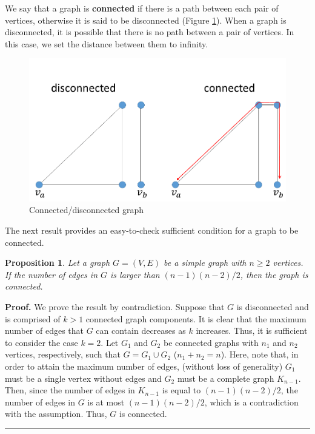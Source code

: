 \documentclass[10.5pt, A4paper, openany, uplatex]{book}
\newtheorem{proposition}[theorem]{Proposition}
{\theorembodyfont{\upshape}
\newtheorem{remark}{Remark}
}
\newenvironment{proof}[1][Proof]{\textbf{#1.} }{\  \rule{0.5em}{0.5em}}
\numberwithin{equation}{section}
\begin{document}
\begin{appendices}
	We say that a graph is \textbf{connected} if there is a path between each pair of vertices, otherwise it is said to be disconnected (Figure \ref{fig:connected}).
	When a graph is disconnected, it is possible that there is no path between a pair of vertices.
	In this case, we set the distance between them to infinity.
	
	\begin{figure}[h!]
		\begin{center}
			\includegraphics[width = 12cm]{connected.png}
			\caption{Connected/disconnected graph\label{fig:connected}}
		\end{center}
	\end{figure}
	
	The next result provides an easy-to-check sufficient condition for a graph to be connected.
	\begin{proposition}
		Let a graph $G = (V, E)$ be a simple graph with $n \ge 2$ vertices. 
		If the number of edges in $G$ is larger than $(n-1)(n-2)/2$, then the graph is connected.
	\end{proposition}
	
	\begin{proof}
		We prove the result by contradiction.
		Suppose that $G$ is disconnected and is comprised of $k > 1$ connected graph components.
		It is clear that the maximum number of edges that $G$ can contain decreases as $k$ increases.
		Thus, it is sufficient to consider the case $k = 2$.
		Let $G_1$ and $G_2$ be connected graphs with $n_1$ and $n_2$ vertices, respectively, such that $G = G_1 \cup G_2$ ($n_1 + n_2 = n$).
		Here, note that, in order to attain the maximum number of edges, (without loss of generality) $G_1$ must be a single vertex without edges and $G_2$ must be a complete graph $K_{n-1}$.
		Then, since the number of edges in $K_{n-1}$ is equal to $(n-1)(n-2)/2$, the number of edges in $G$ is at most $(n-1)(n-2)/2$, which is a contradiction with the assumption.
		Thus, $G$ is connected.
	\end{proof}
	

\end{appendices}
\end{document}
